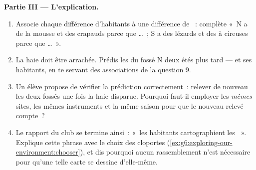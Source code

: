\begin{problem}
\medskip\noindent\textbf{Partie III --- L'explication.}
\begin{enumerate}[resume]
  \item Associe chaque différence d'habitants à une différence de
        ~: complète «~N a de la mousse et des crapauds
        parce que \dots~; S a des lézards et des  à 
        cireuses parce que \dots~».
  \item La haie doit être arrachée. Prédis les  du fossé
        N deux étés plus tard --- et ses habitants, en te servant
        des associations de la question 9.
  \item Un élève propose de vérifier la prédiction correctement~:
        relever de nouveau les deux fossés une fois la haie
        disparue. Pourquoi faut-il employer les \emph{mêmes} sites,
        les mêmes instruments et la même saison pour que le nouveau
        relevé compte~?
  \item Le rapport du club se termine ainsi~: «~les habitants
        cartographient les ~». Explique cette phrase avec
        le choix des cloportes
        (\cref{ex:g6:exploring-our-environment:chooser}), et dis
        pourquoi aucun rassemblement n'est nécessaire pour qu'une
        telle carte se dessine d'elle-même.
\end{enumerate}
\end{problem}

